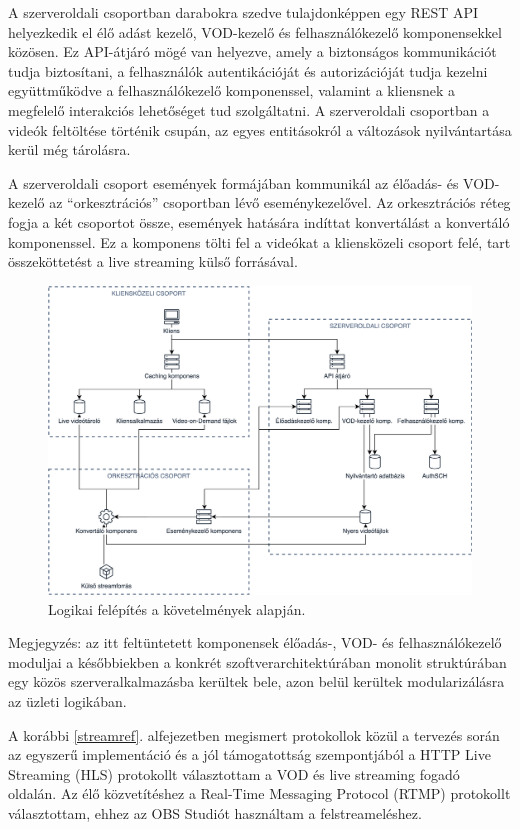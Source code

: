 A szerveroldali csoportban darabokra szedve tulajdonképpen egy REST API helyezkedik el élő adást kezelő, VOD-kezelő és felhasználókezelő komponensekkel közösen. Ez API-átjáró mögé van helyezve, amely a biztonságos kommunikációt tudja biztosítani, a felhasználók autentikációját és autorizációját tudja kezelni együttműködve a felhasználókezelő komponenssel, valamint a kliensnek a megfelelő interakciós lehetőséget tud szolgáltatni. A szerveroldali csoportban a videók feltöltése történik csupán, az egyes entitásokról a változások nyilvántartása kerül még tárolásra.

A szerveroldali csoport események formájában kommunikál az élőadás- és VOD-kezelő az ``orkesztrációs'' csoportban lévő eseménykezelővel. Az orkesztrációs réteg fogja a két csoportot össze, események hatására indíttat konvertálást a konvertáló komponenssel. Ez a komponens tölti fel a videókat a kliensközeli csoport felé, tart összeköttetést a live streaming külső forrásával.

\begin{figure}[]
	\centering
	\includegraphics[width=140mm, keepaspectratio]{figures/dipterv_highlevel.png}
	\caption{Logikai felépítés a követelmények alapján.}
	\label{fig:highlevel}
\end{figure}

Megjegyzés: az itt feltüntetett komponensek élőadás-, VOD- és felhasználókezelő moduljai a későbbiekben a konkrét szoftverarchitektúrában monolit struktúrában egy közös szerveralkalmazásba kerültek bele, azon belül kerültek modularizálásra az üzleti logikában.

A korábbi \ref{streamref}. alfejezetben megismert protokollok közül a tervezés során az egyszerű implementáció és a jól támogatottság szempontjából a HTTP Live Streaming (HLS) protokollt választottam a VOD és live streaming fogadó oldalán. Az élő közvetítéshez a Real-Time Messaging Protocol (RTMP) protokollt választottam, ehhez az OBS Studiót használtam a felstreameléshez.

